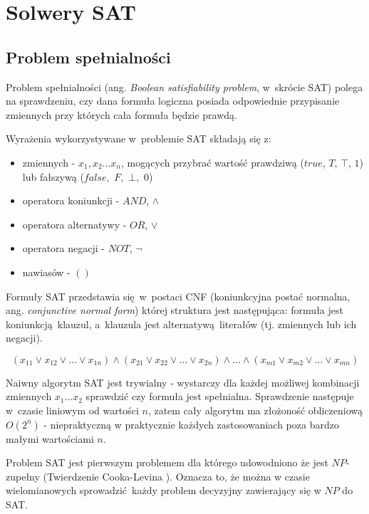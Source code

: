 \chapter{Solwery SAT}

\section{Problem spełnialności}
Problem spełnialności (ang. \textit{Boolean satisfiability problem}, w~skrócie SAT) polega na sprawdzeniu, czy dana formuła logiczna
posiada odpowiednie przypisanie zmiennych przy których cała formuła będzie prawdą.

Wyrażenia wykorzystywane w~problemie SAT składają się z: 
\begin{itemize}
    \item zmiennych - $x_1, x_2 \dots x_n$, mogących przybrać wartość prawdziwą ($true$, $T$, $\top$, $1$) 
    lub fałszywą ($false$,~$F$,~$\bot$,~$0$)
    \item operatora koniunkcji - $AND$, $\land$
    \item operatora alternatywy - $OR$, $\lor$
    \item operatora negacji - $NOT$, $\lnot$
    \item nawiasów - $()$
\end{itemize}

Formuły SAT przedstawia się w~postaci CNF (koniunkcyjna postać normalna, ang. \textit{conjunctive normal form}) 
której struktura jest następująca: formuła jest koniunkcją klauzul, a~klauzula jest alternatywą literałów (tj. zmiennych lub ich negacji).

\[ (x_{11} \lor x_{12} \lor \dots \lor x_{1n} ) \land (x_{21} \lor x_{22} \lor \dots \lor x_{2n} ) \land  \dots \land (x_{m1} \lor x_{m2} \lor \dots \lor x_{mn} ) \]


Naiwny algorytm SAT jest trywialny - wystarczy dla każdej możliwej kombinacji zmiennych $x_1 \dots x_2$
sprawdzić czy formuła jest spełnialna. Sprawdzenie następuje w~czasie liniowym od wartości $n$, zatem cały algorytm
ma złożoność obliczeniową $O(2^n)$ - niepraktyczną w praktycznie każdych zastosowaniach poza bardzo małymi wartościami $n$.

Problem SAT jest pierwszym problemem dla którego udowodniono że jest $NP$-zupełny (Twierdzenie Cooka-Levina \cite{cook-SAT, levin-SAT}).
Oznacza to, że można w czasie wielomianowych sprowadzić każdy problem decyzyjny zawierający się w $NP$ do SAT.


